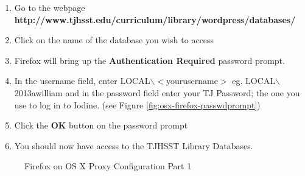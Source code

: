 \documentclass{article}
\newcommand{\librarydbpage}{http://www.tjhsst.edu/curriculum/library/wordpress/databases/}
\begin{document}
\begin{flushleft}
\begin{enumerate}
\item Go to the webpage \textbf{\librarydbpage}
\item Click on the name of the database you wish to access
\item Firefox will bring up the \textbf{Authentication Required} password prompt.
\item In the username field, enter LOCAL$\backslash$$<$yourusername$>$ eg. LOCAL$\backslash$2013awilliam and in the password field enter your TJ Password; the one you use to log in to Iodine. (see Figure \ref{fig:osx-firefox-passwdprompt})
\item Click the \textbf{OK} button on the password prompt
\item You should now have access to the TJHSST Library Databases.
\end{enumerate}
\begin{figure}[H]
\centering
{}
\caption{Firefox on OS X Proxy Configuration Part 1}
\end{figure}
\begin{figure}[H]

\end{figure}
\end{flushleft}
\end{document}
